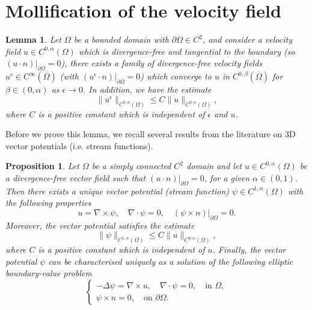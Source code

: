 \documentclass[12pt,a4paper]{article}
\newtheorem{lemma}[theorem]{Lemma}
\newtheorem{proposition}[theorem]{Proposition}
\theoremstyle{definition}
\theoremstyle{remark}
\numberwithin{equation}{section}
\begin{document}
\section{Mollification of the velocity field} \label{mollificationsection}
\begin{lemma} \label{mollificationlemma}
Let $\Omega$ be a bounded domain with $\partial \Omega \in C^2$, and consider a velocity field $u \in C^{0, \alpha} (\Omega)$ which is divergence-free and tangential to the boundary (so $(u \cdot n) \lvert_{\partial \Omega} = 0$), there exists a family of divergence-free velocity fields $u^\epsilon \in C^\infty (\overline{\Omega})$ (with $(u^\epsilon \cdot n) \lvert_{\partial \Omega} = 0$) which converge to $u $ in $C^{0,\beta} (\overline{\Omega})$ for $\beta \in (0,\alpha)$ as $\epsilon \rightarrow 0$. In addition, we have the estimate
\begin{equation}
\lVert u^\epsilon \rVert_{C^{0, \alpha} (\Omega)} \leq C \lVert u \rVert_{C^{0, \alpha} (\Omega)},
\end{equation}
where $C$ is a positive constant which is independent of $\epsilon$ and $u$.
\end{lemma}
Before we prove this lemma, we recall several results from the literature on 3D vector potentials (i.e. stream functions).
\begin{proposition} \label{streamfunction}
Let $\Omega$ be a simply connected $C^2$ domain and let $u \in C^{0,\alpha} (\Omega)$ be a divergence-free vector field such that $(u \cdot n) \lvert_{\partial \Omega} = 0$, for a given $\alpha \in (0,1)$. Then there exists a unique vector potential (stream function) $\psi \in C^{1,\alpha} (\Omega)$ with the following properties
\begin{equation} \label{streamfunctionproperties}
u = \nabla \times \psi, \quad \nabla \cdot \psi = 0, \quad (\psi \times n) \lvert_{\partial \Omega} = 0.
\end{equation}
Moreover, the vector potential satisfies the estimate
\begin{equation} \label{streamfunctionestimate}
\lVert \psi \rVert_{C^{1,\alpha} (\Omega)} \leq C \lVert u \rVert_{C^{0,\alpha} (\Omega)},
\end{equation}
where $C$ is a positive constant which is independent of $u$.
Finally, the vector potential $\psi$ can be characterised uniquely as a solution of the following elliptic boundary-value problem
\begin{equation}
\begin{cases}
- \Delta \psi = \nabla \times u, \quad \nabla \cdot \psi = 0, \quad \text{in } \Omega, \\
\psi \times n = 0, \quad \text{on } \partial \Omega.
\end{cases}
\end{equation}
\end{proposition}
\end{document}

